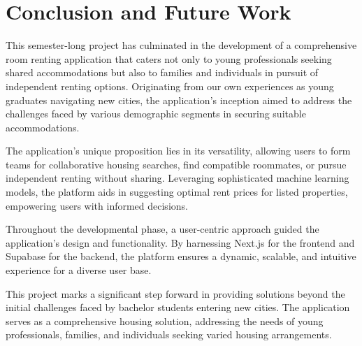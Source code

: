 
\chapter{Conclusion and Future Work} %

\label{Chapter5} %

This semester-long project has culminated in the development of a comprehensive room renting application that caters not only to young professionals seeking shared accommodations but also to families and individuals in pursuit of independent renting options. Originating from our own experiences as young graduates navigating new cities, the application's inception aimed to address the challenges faced by various demographic segments in securing suitable accommodations.\par\medskip

The application's unique proposition lies in its versatility, allowing users to form teams for collaborative housing searches, find compatible roommates, or pursue independent renting without sharing. Leveraging sophisticated machine learning models, the platform aids in suggesting optimal rent prices for listed properties, empowering users with informed decisions.\par\medskip

Throughout the developmental phase, a user-centric approach guided the application's design and functionality. By harnessing Next.js for the frontend and Supabase for the backend, the platform ensures a dynamic, scalable, and intuitive experience for a diverse user base.\par\medskip

This project marks a significant step forward in providing solutions beyond the initial challenges faced by bachelor students entering new cities. The application serves as a comprehensive housing solution, addressing the needs of young professionals, families, and individuals seeking varied housing arrangements.\medskip
\clearpage

